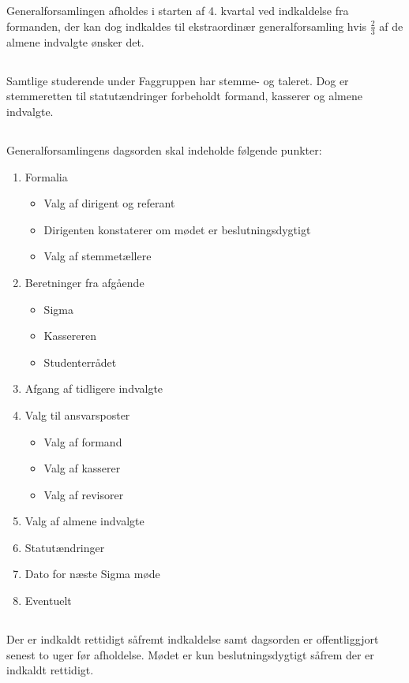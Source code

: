 \documentclass[danish,a4paper,twocolumn]{article}
\begin{document}
\subsection{}Generalforsamlingen afholdes i starten af 4. kvartal ved indkaldelse fra formanden, der kan dog indkaldes til ekstraordinær generalforsamling hvis $\frac{2}{3}$ af de almene indvalgte ønsker det.
\subsection{}Samtlige studerende under Faggruppen har stemme- og taleret. Dog er stemmeretten til statutændringer forbeholdt formand, kasserer og almene indvalgte.
\subsection{}Generalforsamlingens dagsorden skal indeholde følgende punkter:
\begin{enumerate}
\item Formalia
  \begin{itemize}
  \item Valg af dirigent og referant
  \item Dirigenten konstaterer om mødet er beslutningsdygtigt
  \item Valg af stemmetællere
  \end{itemize}
\item Beretninger fra afgående
  \begin{itemize}
  \item Sigma
  \item Kassereren
  \item Studenterrådet
  \end{itemize}
\item Afgang af tidligere indvalgte
\item Valg til ansvarsposter
  \begin{itemize}
      \item Valg af formand
      \item Valg af kasserer
      \item Valg af revisorer
  \end{itemize}
\item Valg af almene indvalgte
\item Statutændringer
\item Dato for næste Sigma møde
\item Eventuelt
\end{enumerate}
\subsection{}Der er indkaldt rettidigt såfremt indkaldelse samt dagsorden er offentliggjort senest to uger før afholdelse. Mødet er kun beslutningsdygtigt såfrem der er indkaldt rettidigt.
\end{document}
